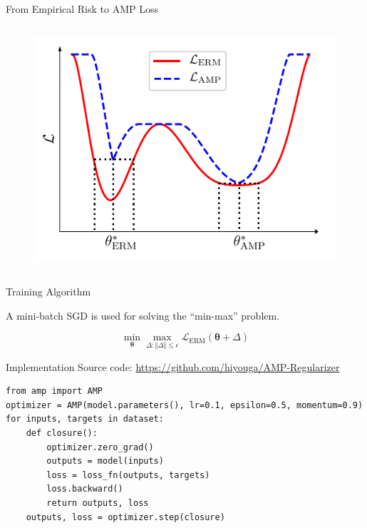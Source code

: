 \begin{frame}{From Empirical Risk to AMP Loss}
\begin{columns}
\begin{figure}
\includegraphics[width=.8\textwidth]{figs/loss_example_b.pdf}
\end{figure}
\end{columns}

\end{frame}


\begin{frame}{Training Algorithm}

A mini-batch SGD is used for solving the ``min-max'' problem.

\begin{equation}
\min_{\boldsymbol{\theta}}\max_{\Delta:\Vert\Delta\Vert\le\epsilon}\mathcal{L}_\mathrm{ERM}(\boldsymbol{\theta}+\Delta)
\end{equation}

\begin{algorithm}[H]
\SetAlgoVlined
{}
\caption{Adversarial Model Perturbation Training}
\end{algorithm}
\end{frame}

\begin{frame}[fragile]{Implementation}
Source code: \url{https://github.com/hiyouga/AMP-Regularizer}

\begin{verbatim}
from amp import AMP
optimizer = AMP(model.parameters(), lr=0.1, epsilon=0.5, momentum=0.9)
for inputs, targets in dataset:
    def closure():
        optimizer.zero_grad()
        outputs = model(inputs)
        loss = loss_fn(outputs, targets)
        loss.backward()
        return outputs, loss
    outputs, loss = optimizer.step(closure)
\end{verbatim}
\end{frame}
